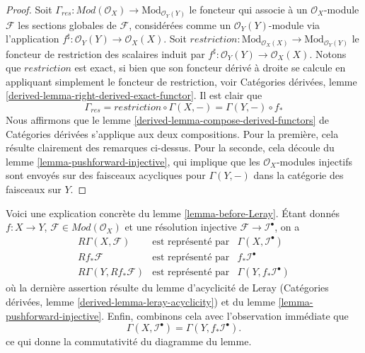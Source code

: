 \begin{proof}

Soit $\Gamma_{res} : \textit{Mod}(\mathcal{O}_X) \to \text{Mod}_{\mathcal{O}_Y(Y)}$
le foncteur qui associe à un $\mathcal{O}_X$-module $\mathcal{F}$
les sections globales de $\mathcal{F}$, considérées comme un $\mathcal{O}_Y(Y)$-module via l'application $f^\sharp : \mathcal{O}_Y(Y) \to \mathcal{O}_X(X)$. Soit $restriction : \text{Mod}_{\mathcal{O}_X(X)} \to \text{Mod}_{\mathcal{O}_Y(Y)}$
le foncteur de restriction des scalaires induit par
$f^\sharp : \mathcal{O}_Y(Y) \to \mathcal{O}_X(X)$. Notons que $restriction$
est exact, si bien que son foncteur dérivé à droite se calcule en appliquant simplement le foncteur de restriction, voir Catégories dérivées, lemme \ref{derived-lemma-right-derived-exact-functor}. Il est clair que
$$
\Gamma_{res}
=
restriction \circ \Gamma(X, -)
=
\Gamma(Y, -) \circ f_*
$$
Nous affirmons que le lemme \ref{derived-lemma-compose-derived-functors} de Catégories dérivées s'applique aux deux compositions.
Pour la première, cela résulte clairement des remarques ci-dessus. Pour la seconde, cela découle du lemme \ref{lemma-pushforward-injective}, qui implique que les $\mathcal{O}_X$-modules injectifs sont envoyés sur des faisceaux acycliques pour $\Gamma(Y, -)$ dans la catégorie des faisceaux sur $Y$.

\end{proof}

\begin{remark}

\label{remark-elucidate-lemma}
Voici une explication concrète du lemme \ref{lemma-before-Leray}. Étant donnés $f : X \to Y$, $\mathcal{F} \in \textit{Mod}(\mathcal{O}_X)$ et une résolution injective $\mathcal{F} \to \mathcal{I}^\bullet$, on a $$
\begin{matrix}
R\Gamma(X, \mathcal{F}) & \text{est représenté par} &
\Gamma(X, \mathcal{I}^\bullet) \\
Rf_*\mathcal{F} & \text{est représenté par} & f_*\mathcal{I}^\bullet \\
R\Gamma(Y, Rf_*\mathcal{F}) & \text{est représenté par} &
\Gamma(Y, f_*\mathcal{I}^\bullet)
\end{matrix}
$$ où la dernière assertion résulte du lemme d'acyclicité de Leray (Catégories dérivées, lemme \ref{derived-lemma-leray-acyclicity}) et du lemme \ref{lemma-pushforward-injective}. Enfin, combinons cela avec l'observation immédiate que $$
\Gamma(X, \mathcal{I}^\bullet)
=
\Gamma(Y, f_*\mathcal{I}^\bullet).
$$ ce qui donne la commutativité du diagramme du lemme.
\end{remark}

